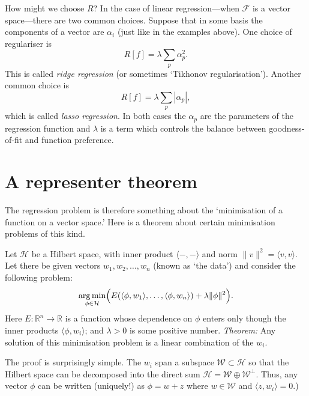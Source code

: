\documentclass[11pt]{article}
\begin{document}
How might we choose \(R\)? In the case of linear regression---when \(\mathcal{F}\) is
a vector space---there are two common choices. Suppose that in some basis the
components of a vector are \(\alpha_i\) (just like in the examples above). One
choice of regulariser is
\begin{equation}
R[f] = \lambda \sum_p \alpha_p^2.
\end{equation}
This is called \emph{ridge regression} (or sometimes `Tikhonov
regularisation'). Another common choice is
\begin{equation}
R[f] = \lambda \sum_p \left|\alpha_p\right|,
\end{equation}
which is called \emph{lasso regression}. In both cases the \(\alpha_p\) are the
parameters of the regression function and \(\lambda\) is a term which controls the
balance between goodness-of-fit and function preference.


\section{A representer theorem}
\label{sec:orgf57b0de}

The regression problem is therefore something about the `minimisation of a
function on a vector space.' Here is a theorem about certain minimisation
problems of this kind.

Let \(\mathcal{H}\) be a Hilbert space, with inner product \(\langle -,-\rangle\)
and norm \(\lVert v\rVert^2 = \langle v, v\rangle\). Let there be given vectors
\(w_1, w_2, \dotsc, w_n\) (known as `the data') and consider the following problem:
\begin{equation}
\operatorname*{arg\,min}_{\phi\in\mathcal{H}} \Bigl( 
E(\langle\phi, w_1\rangle, \dotsc, \langle\phi, w_n\rangle) +
\lambda \lVert \phi \rVert^2
\Bigr). 
\end{equation}
Here \(E:\mathbb{R}^n\to\mathbb{R}\) is a function whose dependence on \(\phi\)
enters only though the inner products \(\langle \phi, w_i\rangle\); and
\(\lambda>0\) is some positive number. \emph{Theorem:} Any solution of this
minimisation problem is a linear combination of the \(w_i\).

The proof is surprisingly simple. The \(w_i\) span a subspace
\(\mathcal{W}\subset\mathcal{H}\) so that the Hilbert space can be decomposed into
the direct sum \(\mathcal{H} = \mathcal{W} \oplus\mathcal{W}^\perp\). Thus, any
vector \(\phi\) can be written (uniquely!) as \(\phi = w + z\) where \(w\in
\mathcal{W}\) and \(\langle z, w_i\rangle = 0\).)
\end{document}
